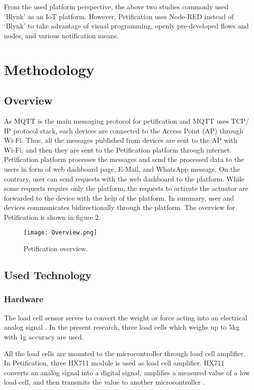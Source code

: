 \documentclass[conference]{IEEEtran}
\begin{document}
From the used platform perspective, the above two studies commonly used ‘Blynk’ as an IoT platform. However, Petification uses Node-RED instead of ‘Blynk’ to take advantage of visual programming, openly pre-developed flows and nodes, and various notification means.

\section{Methodology}
\subsection{Overview}
As MQTT is the main messaging protocol for petification and MQTT uses TCP/ IP protocol stack, each devices are connected to the Access Point (AP) through Wi-Fi. Thus, all the messages published from devices are sent to the AP with Wi-Fi, and then they are sent to the Petification platform through internet. Petification platform processes the messages and send the processed data to the users in form of web dashboard page, E-Mail, and WhatsApp message. On the contrary, user can send requests with the web dashboard to the platform. While some requests require only the platform, the requests to activate the actuator are forwarded to the device with the help of the platform. In summary, user and devices communicates bidirectionally through the platform. The overview for Petification is shown in figure 2.

\begin{figure}[htbp]
\centerline{\texttt{[image: Overview.png]}}
\caption{Petification overview.}
\label{fig}
\end{figure}

\subsection{Used Technology}
\subsubsection{Hardware}
The load cell sensor serves to convert the weight or force acting into an electrical analog signal \cite{b15}. In the present research, three load cells which weighs up to 5kg with 1g accuracy are used.

All the load cells are mounted to the microcontroller through load cell amplifier. In Petification, three HX711 module is used as load cell amplifier. HX711 converts an analog signal into a digital signal, amplifies a measured value of a low load cell, and then transmits the value to another microcontroller \cite{b16}. 
\end{document}

